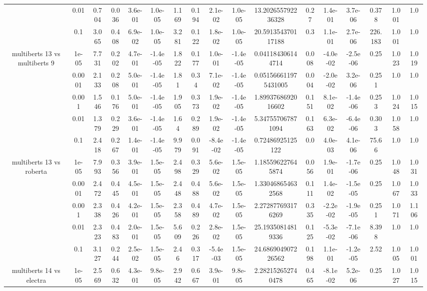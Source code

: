 \begin{tabular}{|c|c|c|c|c|c|c|c|c|c|c|c|c|c|c|c|c|}
 & 0.01 & 0.704 & 0.036 & 3.6e-01 & 1.0e-05 & 1.169 & 0.194 & 2.1e-02 & 1.0e-05 & 13.202655792236328 & 0.27 & 1.4e-01 & 3.7e-06 & 0.378 & 1.001 & 1.0 \\
 & 0.1 & 3.065 & 0.408 & 6.9e-02 & 1.0e-05 & 3.281 & 0.122 & 1.8e-02 & 1.0e-05 & 20.591354370117188 & 0.3 & 1.1e-01 & 2.7e-06 & 226.183 & 1.001 & 1.0 \\
\hline
\multirow{5}{*}{multiberts 13 vs multiberts 9} & 1e-05 & 7.731 & 0.202 & 4.7e-01 & -1.4e-05 & 1.822 & 0.177 & 1.0e-01 & -1.4e-05 & 0.041184306144714 & 0.008 & -4.0e-02 & -2.5e-06 & 0.25 & 1.023 & 1.019 \\
 & 0.0001 & 2.133 & 0.208 & 5.0e-01 & -1.4e-05 & 1.81 & 0.34 & 7.1e-02 & -1.4e-05 & 0.051566611975431005 & 0.004 & -2.0e-02 & 3.2e-06 & 0.251 & 1.0 & 1.0 \\
 & 0.001 & 1.546 & 0.176 & 5.0e-01 & -1.4e-05 & 1.905 & 0.373 & 1.9e-02 & -1.4e-05 & 1.8993768692016602 & 0.151 & 8.1e-02 & -1.4e-06 & 0.253 & 1.024 & 1.015 \\
 & 0.01 & 1.379 & 0.229 & 3.6e-01 & -1.4e-05 & 1.64 & 0.289 & 1.9e-02 & -1.4e-05 & 5.347557067871094 & 0.163 & 6.3e-02 & -6.4e-06 & 0.303 & 1.058 & 1.0 \\
 & 0.1 & 2.418 & 0.267 & 1.4e-01 & -1.4e-05 & 9.979 & 0.091 & -8.4e-02 & -1.4e-05 & 0.72486925125122 & 0.0 & 4.0e-03 & 4.1e-06 & 75.66 & 1.0 & 1.0 \\
\hline
\multirow{5}{*}{multiberts 13 vs roberta } & 1e-05 & 7.993 & 0.356 & 3.9e-01 & 1.5e-05 & 2.498 & 0.329 & 5.6e-02 & 1.5e-05 & 1.185596227645874 & 0.056 & 1.9e-01 & -1.7e-06 & 0.25 & 1.048 & 1.031 \\
 & 0.0001 & 2.472 & 0.445 & 4.5e-01 & 1.5e-05 & 2.448 & 0.488 & 5.6e-02 & 1.5e-05 & 1.330468654632568 & 0.111 & 1.4e-02 & -1.5e-05 & 0.25 & 1.067 & 1.033 \\
 & 0.001 & 2.338 & 0.426 & 4.2e-01 & 1.5e-05 & 2.358 & 0.489 & 4.7e-02 & 1.5e-05 & 2.272877693176269 & 0.335 & -2.2e-02 & -1.9e-05 & 0.251 & 1.071 & 1.106 \\
 & 0.01 & 2.323 & 0.483 & 2.0e-01 & 1.5e-05 & 5.609 & 0.226 & 2.8e-02 & 1.5e-05 & 25.19350814819336 & 0.125 & -5.3e-02 & -7.1e-06 & 8.398 & 1.0 & 1.0 \\
 & 0.1 & 3.127 & 0.244 & 2.5e-02 & 1.5e-05 & 2.46 & 0.317 & -5.4e-03 & 1.5e-05 & 24.686904907226562 & 0.198 & 1.1e-01 & -1.2e-05 & 2.52 & 1.005 & 1.001 \\
\hline
\multirow{5}{*}{multiberts 14 vs electra } & 1e-05 & 2.569 & 0.632 & 4.3e-01 & 9.8e-05 & 2.942 & 0.667 & 3.9e-01 & 9.8e-05 & 2.282152652740478 & 0.465 & -8.1e-02 & 5.2e-06 & 0.25 & 1.027 & 1.015 \\

\end{tabular}
